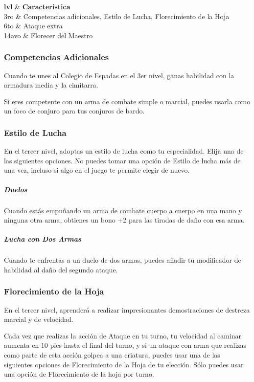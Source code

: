 \documentclass[a4paper,twocolumn,openany,10pt]{dndbook}
\begin{document}
\begin{dndtable}[cX]
  \textbf{lvl} & \textbf{Caracteristica} 												\\
  	3ro		&	Competencias adicionales, Estilo de Lucha, Florecimiento de la Hoja	\\
	6to		&	Ataque extra															\\
	14avo 	&	Florecer del Maestro													\\
\end{dndtable}

\subsubsection{Competencias Adicionales}
Cuando te unes al Colegio de Espadas en el 3er nivel, ganas habilidad con la armadura media y la cimitarra.

Si eres competente con un arma de combate simple o marcial, puedes usarla como un foco de conjuro para tus conjuros de bardo. 

\subsubsection{Estilo de Lucha}
En el tercer nivel, adoptas un estilo de lucha como tu especialidad. Elija una de las siguientes opciones. No puedes tomar una opción de
Estilo de lucha más de una vez, incluso si algo en el juego te permite elegir de nuevo.

\subparagraph{Duelos} Cuando estás empuñando un arma de combate cuerpo a cuerpo en una mano y ninguna otra arma, obtienes un bono +2 para las 
tiradas de daño con esa arma.

\subparagraph{Lucha con Dos Armas} Cuando te enfrentas a un duelo de dos armas, puedes añadir tu modificador de habilidad al daño del segundo
ataque. 

\subsubsection{Florecimiento de la Hoja}
En el tercer nivel, aprenderá a realizar impresionantes demostraciones de destreza marcial y de velocidad.

Cada vez que realizas la acción de Ataque en tu turno, tu velocidad al caminar aumenta en 10 pies hasta el final del turno, y si un ataque
con arma que realizas como parte de esta acción golpea a una criatura, puedes usar una de las siguientes opciones de Florecimiento de la Hoja
de tu elección. Sólo puedes usar una opción de Florecimiento de la hoja por turno.
\end{document}
